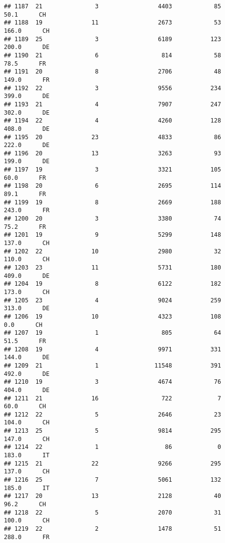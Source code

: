 \documentclass[
]{article}
\begin{document}
\begin{verbatim}
## 1187  21               3                 4403            85     50.1      CH
## 1188  19              11                 2673            53    166.0      CH
## 1189  25               3                 6189           123    200.0      DE
## 1190  21               6                  814            58     78.5      FR
## 1191  20               8                 2706            48    149.0      FR
## 1192  22               3                 9556           234    399.0      DE
## 1193  21               4                 7907           247    302.0      DE
## 1194  22               4                 4260           128    408.0      DE
## 1195  20              23                 4833            86    222.0      DE
## 1196  20              13                 3263            93    199.0      DE
## 1197  19               3                 3321           105     60.0      FR
## 1198  20               6                 2695           114     89.1      FR
## 1199  19               8                 2669           188    243.0      FR
## 1200  20               3                 3380            74     75.2      FR
## 1201  19               9                 5299           148    137.0      CH
## 1202  22              10                 2980            32    110.0      CH
## 1203  23              11                 5731           180    409.0      DE
## 1204  19               8                 6122           182    173.0      CH
## 1205  23               4                 9024           259    313.0      DE
## 1206  19              10                 4323           108      0.0      CH
## 1207  19               1                  805            64     51.5      FR
## 1208  19               4                 9971           331    144.0      DE
## 1209  21               1                11548           391    492.0      DE
## 1210  19               3                 4674            76    404.0      DE
## 1211  21              16                  722             7     60.0      CH
## 1212  22               5                 2646            23    104.0      CH
## 1213  25               5                 9814           295    147.0      CH
## 1214  22               1                   86             0    183.0      IT
## 1215  21              22                 9266           295    137.0      CH
## 1216  25               7                 5061           132    185.0      IT
## 1217  20              13                 2128            40     96.2      CH
## 1218  22               5                 2070            31    100.0      CH
## 1219  22               2                 1478            51    288.0      FR

\end{verbatim}
\end{document}

